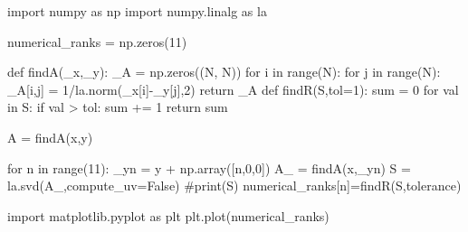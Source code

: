 \documentclass{article}
\begin{document}
\begin{python}
import numpy as np
import numpy.linalg as la



numerical_ranks = np.zeros(11)

def findA(_x,_y):
    _A = np.zeros((N, N))
    for i in range(N):
        for j in range(N):
            _A[i,j] = 1/la.norm(_x[i]-_y[j],2)
    return _A
def findR(S,tol=1):
    sum = 0
    for val in S:
        if val > tol:
            sum += 1
    return sum

A = findA(x,y)

for n in range(11):
    _yn = y + np.array([n,0,0])
    A_ = findA(x,_yn)
    S = la.svd(A_,compute_uv=False)
    #print(S)
    numerical_ranks[n]=findR(S,tolerance)

import matplotlib.pyplot as plt
plt.plot(numerical_ranks)
\end{python}
\end{document}
